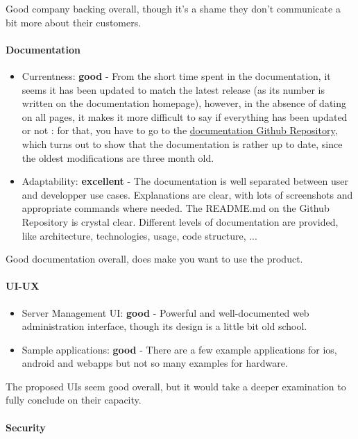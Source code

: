 \documentclass{article}
\begin{document}
Good company backing overall, though it's a shame they don't communicate a bit more about their customers.

\paragraph{Documentation}

\begin{itemize}
\item Currentness: \textbf{good} - From the short time spent in the documentation, it seems it has been updated to match the latest release (as its number is written on the documentation homepage), however, in the absence of dating on all pages, it makes it more difficult to say if everything has been updated or not : for that, you have to go to the \href{https://github.com/sitewhere/sitewhere-documentation/}{documentation Github Repository}, which turns out to show that the documentation is rather up to date, since the oldest modifications are three month old.
\item Adaptability: \textbf{excellent} - The documentation is well separated between user and developper use cases. Explanations are clear, with lots of screenshots and appropriate commands where needed. The README.md on the Github Repository is crystal clear. Different levels of documentation are provided, like architecture, technologies, usage, code structure, ...
\end{itemize}

Good documentation overall, does make you want to use the product.

\paragraph{UI-UX}

\begin{itemize}
\item Server Management UI: \textbf{good} - Powerful and well-documented web administration interface, though its design is a little bit old school.
\item Sample applications: \textbf{good} - There are a few example applications for ios, android and webapps but not so many examples for hardware.
\end{itemize}

The proposed UIs seem good overall, but it would take a deeper examination to fully conclude on their capacity.

\paragraph{Security}
\end{document}
